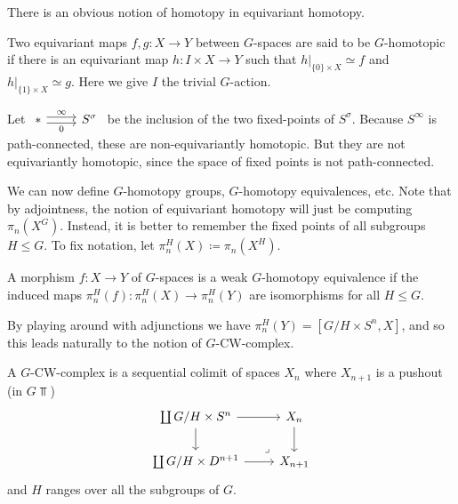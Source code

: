 \documentclass{willowtreebook}
\begin{document}
There is an obvious notion of homotopy in equivariant homotopy. 
\begin{definition}
    Two equivariant maps $f,g \colon X \to Y$ between $G$-spaces are said to be $G$-homotopic if there is an equivariant map $h \colon I \times X \to Y$ such that $h|_{\{ 0\} \times X} \simeq f$ and $h|_{\{ 1\} \times X} \simeq g$. Here we give $I$ the trivial $G$-action. 
\end{definition}
\begin{example}
    Let %
$\begin{tikzcd}[ampersand replacement=\&]
	\ast \& {S^{\sigma}}
	\arrow["\infty", shift left, from=1-1, to=1-2]
	\arrow["0"', shift right, from=1-1, to=1-2]
\end{tikzcd}$  be the inclusion of the two fixed-points of $S^{\sigma}$. Because $S^{\infty}$ is path-connected, these are non-equivariantly homotopic. But they are not equivariantly homotopic, since the space of fixed points is not path-connected. 
\end{example}
We can now define $G$-homotopy groups, $G$-homotopy equivalences, etc. Note that by adjointness, the notion of equivariant homotopy will just be computing $\pi_n(X^G)$. Instead, it is better to remember the fixed points of all subgroups $H \le G$. To fix notation, let $\pi_n^H(X) \coloneqq \pi_n(X^H)$. 
\begin{definition}
    A morphism $f \colon X \to Y$ of $G$-spaces is a weak $G$-homotopy equivalence if the induced maps $\pi_n^H(f) \colon \pi_n^H(X) \to \pi_n^H(Y)$ are isomorphisms for all $H \le G$. 
\end{definition}
\begin{remark}
    By playing around with adjunctions we have $\pi_n^H(Y) = [G/H \times S^n,X]$, and so this leads naturally to the notion of $G$-CW-complex. 
\end{remark}
\begin{definition}
    A $G$-CW-complex is a sequential colimit of spaces $X_n$ where $X_{n+1}$ is a pushout (in $G\Top$)
\[\begin{tikzcd}[ampersand replacement=\&]
	{\coprod G/H \times S^n} \& {X_n} \\
	{\coprod G/H \times D^{n+1}} \& {X_{n+1}}
	\arrow[from=1-1, to=1-2]
	\arrow[from=1-1, to=2-1]
	\arrow[from=2-1, to=2-2]
	\arrow[from=1-2, to=2-2]
	\arrow["\ulcorner"{anchor=center, pos=0.125, rotate=180}, draw=none, from=2-2, to=1-1]
\end{tikzcd}\]
and $H$ ranges over all the subgroups of $G$. 
\end{definition}
\end{document}
